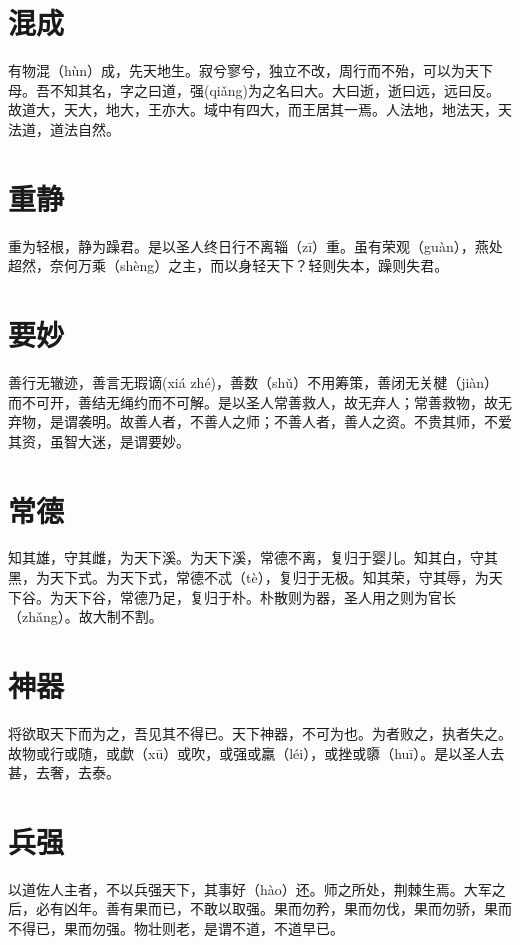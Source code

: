 \documentclass[a4paper,12pt,UTF8,twoside]{ctexbook}
\begin{document}
	
	
	\chapter{混成}
	
	有物混（hùn）成，先天地生。寂兮寥兮，独立不改，周行而不殆，可以为天下母。吾不知其名，字之曰道，强(qiǎng)为之名曰大。大曰逝，逝曰远，远曰反。故道大，天大，地大，王亦大。域中有四大，而王居其一焉。人法地，地法天，天法道，道法自然。
	
	
	

	\chapter{重静}
	重为轻根，静为躁君。是以圣人终日行不离辎（zī）重。虽有荣观（guàn），燕处超然，奈何万乘（shèng）之主，而以身轻天下？轻则失本，躁则失君。
	
	
	
	\chapter{要妙}
	
	善行无辙迹，善言无瑕谪(xiá zhé)，善数（shǔ）不用筹策，善闭无关楗（jiàn）而不可开，善结无绳约而不可解。是以圣人常善救人，故无弃人；常善救物，故无弃物，是谓袭明。故善人者，不善人之师；不善人者，善人之资。不贵其师，不爱其资，虽智大迷，是谓要妙。	
	
	
	\chapter{常德}
	
	知其雄，守其雌，为天下溪。为天下溪，常德不离，复归于婴儿。知其白，守其黑，为天下式。为天下式，常德不忒（tè），复归于无极。知其荣，守其辱，为天下谷。为天下谷，常德乃足，复归于朴。朴散则为器，圣人用之则为官长（zhǎng）。故大制不割。	
	

	\chapter{神器}
		
	将欲取天下而为之，吾见其不得已。天下神器，不可为也。为者败之，执者失之。故物或行或随，或歔（xū）或吹，或强或羸（léi），或挫或隳（huī）。是以圣人去甚，去奢，去泰。
	
	
	

	\chapter{兵强}
	以道佐人主者，不以兵强天下，其事好（hào）还。师之所处，荆棘生焉。大军之后，必有凶年。善有果而已，不敢以取强。果而勿矜，果而勿伐，果而勿骄，果而不得已，果而勿强。物壮则老，是谓不道，不道早已。	
	
\end{document}
